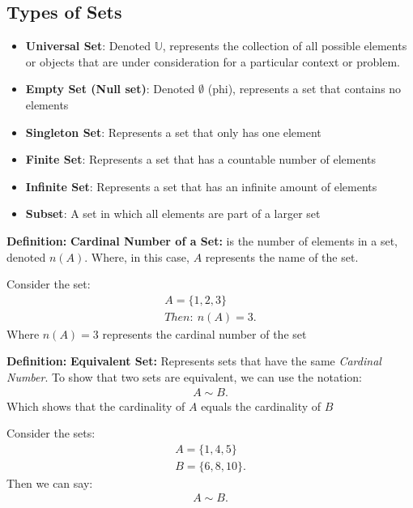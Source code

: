 \documentclass{report}
\begin{document}
    \subsection{Types of Sets}
    \bigbreak \noindent 
    \begin{itemize}
        \item \textbf{Universal Set}: Denoted $\mathbb{U}$, represents the collection of all possible elements or objects that are under consideration for a particular context or problem.
        \item \textbf{Empty Set (Null set)}: Denoted $\emptyset$ (phi), represents a set that contains no elements
        \item \textbf{Singleton Set}: Represents a set that only has one element
        \item \textbf{Finite Set}: Represents a set that has a countable number of elements
        \item \textbf{Infinite Set}: Represents a set that has an infinite amount of elements
        \item \textbf{Subset}: A set in which all elements are part of a larger set 
    \end{itemize}
    \bigbreak \noindent 
    \begin{mdframed}
        \textbf{Definition:} \textbf{Cardinal Number of a Set:} is the number of elements in a set, denoted $n(A)$. Where, in this case, $A$ represents the name of the set.
    \end{mdframed}
    \bigbreak \noindent 
    Consider the set:
    \begin{align*}
        A = \{1,2,3\} \\
        Then:\ n(A) = 3
    .\end{align*}
    \bigbreak \noindent 
    Where $n(A) = 3$ represents the cardinal number of the set
    \bigbreak \noindent 
    \begin{mdframed}
        \textbf{Definition:} \textbf{Equivalent Set:} Represents sets that have the same \textit{Cardinal Number}. To show that two sets are equivalent, we can use the notation:
        \begin{align*}
            A \sim B 
        .\end{align*}
        \bigbreak \noindent 
        Which shows that the cardinality of $A$ equals the cardinality of $B $ 
    \end{mdframed}
    \bigbreak \noindent 
    Consider the sets:
    \begin{align*}
        A = \{1,4,5\} \\
        B = \{6,8,10\}
    .\end{align*}
    \bigbreak \noindent 
    Then we can say:
    \begin{align*}
        A \sim B 
    .\end{align*}
\end{document}

